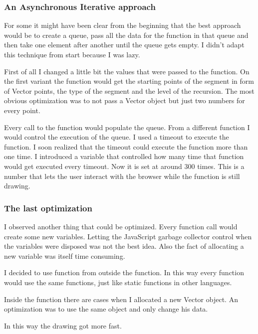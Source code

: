         \subsubsection{An Asynchronous Iterative approach}

            For some it might have been clear from the beginning that the best approach would be to create a queue, pass all the data for the function in that queue and then take one element after another until the queue gets empty.
            I didn't adapt this technique from start because I was lazy.

            First of all I changed a little bit the values that were passed to the function.
            On the first variant the function would get the starting points of the segment in form of Vector points, the type of the segment and the level of the recursion.
            The most obvious optimization was to not pass a Vector object but just two numbers for every point.

            Every call to the function would populate the queue.
            From a different function I would control the execution of the queue.
            I used a timeout to execute the function.
            I soon realized that the timeout could execute the function more than one time.
            I introduced a variable that controlled how many time that function would get executed every timeout.
            Now it is set at around 300 times.
            This is a number that lets the user interact with the browser while the function is still drawing.

        \subsubsection{The last optimization}

            I observed another thing that could be optimized.
            Every function call would create some new variables. 
            Letting the JavaScript garbage collector control when the variables were disposed was not the best idea.
            Also the fact of allocating a new variable was itself time consuming.

            I decided to use function from outside the function.
            In this way every function would use the same functions, just like static functions in other languages.

            Inside the function there are cases when I allocated a new Vector object. 
            An optimization was to use the same object and only change his data.

            In this way the drawing got more fast.
